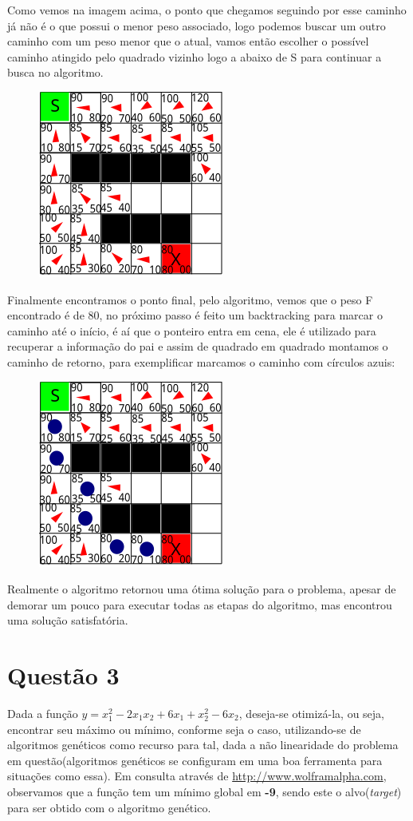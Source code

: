 \documentclass[a4paper, 12pt]{article}
\begin{document}
	Como vemos na imagem acima, o ponto que chegamos seguindo por esse caminho já não é o que possui o menor peso associado, logo podemos buscar um outro caminho com um peso menor que o atual, vamos então escolher o possível caminho atingido pelo quadrado vizinho logo a abaixo de S para continuar a busca no algoritmo.
		\begin{figure}[H]
			\centering
			\includegraphics[width=0.4\linewidth]{4}
		\end{figure}
	Finalmente encontramos o ponto final, pelo algoritmo, vemos que o peso F encontrado é de 80, no próximo passo é feito um backtracking para marcar o caminho até o início, é aí que o ponteiro entra em cena, ele é utilizado para recuperar a informação do pai e assim de quadrado em quadrado montamos o caminho de retorno, para exemplificar marcamos o caminho com círculos azuis:
		\begin{figure}[H]
			\centering
			\includegraphics[width=0.4\linewidth]{5}
		\end{figure}
	Realmente o algoritmo retornou uma ótima solução para o problema, apesar de demorar um pouco para executar todas as etapas do algoritmo, mas encontrou uma solução satisfatória.
	
	\section{Questão 3}
	Dada a função $y = x_{1}^{2} - 2x_{1}x_{2} + 6x_{1} + x_{2}^2 - 6x_{2}$, deseja-se otimizá-la, ou seja, encontrar seu máximo ou mínimo, conforme seja o caso, utilizando-se de algoritmos genéticos como recurso para tal, dada a não linearidade do problema em questão(algoritmos genéticos se configuram em uma boa ferramenta para situações como essa).  Em consulta através de \url{http://www.wolframalpha.com}, observamos que a função tem um mínimo global em \textbf{-9}, sendo este o alvo(\textit{target}) para ser obtido com o algoritmo genético.\\ 
	
\end{document}
